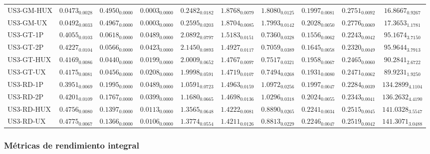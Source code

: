 \begin{longtable}{@{}lccccccccc@{}}
US3-GM-HUX & $0.0473_{0.0028}$ & $0.4950_{0.0000}$ & $0.0003_{0.0000}$ & $0.2482_{0.0182}$ & $1.8768_{0.0079}$ & $1.8080_{0.0125}$ & $0.1997_{0.0081}$ & $0.2751_{0.0092}$ & $16.8667_{0.9267}$ \\
US3-GM-UX & $0.0492_{0.0033}$ & $0.4967_{0.0000}$ & $\mathbf{0.0003}_{0.0000}$ & $0.2595_{0.0203}$ & $1.8704_{0.0085}$ & $1.7993_{0.0142}$ & $0.2028_{0.0050}$ & $0.2776_{0.0069}$ & $17.3653_{1.1781}$ \\
US3-GT-1P & $0.4055_{0.0103}$ & $0.0618_{0.0000}$ & $0.0489_{0.0000}$ & $2.0892_{0.0797}$ & $1.5183_{0.0151}$ & $0.7360_{0.0328}$ & $0.1556_{0.0062}$ & $0.2243_{0.0042}$ & $95.1674_{3.7150}$ \\
US3-GT-2P & $0.4227_{0.0104}$ & $0.0566_{0.0000}$ & $0.0423_{0.0000}$ & $2.1450_{0.0893}$ & $1.4927_{0.0117}$ & $0.7059_{0.0389}$ & $0.1645_{0.0058}$ & $0.2320_{0.0049}$ & $95.9644_{3.7913}$ \\
US3-GT-HUX & $0.4169_{0.0086}$ & $\mathbf{0.0440}_{0.0000}$ & $0.0199_{0.0000}$ & $2.0009_{0.0652}$ & $1.4767_{0.0097}$ & $0.7517_{0.0321}$ & $0.1958_{0.0067}$ & $0.2465_{0.0060}$ & $90.2841_{2.6722}$ \\
US3-GT-UX & $0.4175_{0.0081}$ & $0.0456_{0.0000}$ & $0.0208_{0.0000}$ & $1.9998_{0.0591}$ & $1.4719_{0.0107}$ & $0.7494_{0.0268}$ & $0.1931_{0.0080}$ & $0.2471_{0.0062}$ & $89.9231_{1.9250}$ \\
US3-RD-1P & $0.3951_{0.0069}$ & $0.1995_{0.0000}$ & $0.0489_{0.0000}$ & $1.0591_{0.0723}$ & $1.4963_{0.0159}$ & $1.0972_{0.0256}$ & $0.1997_{0.0047}$ & $0.2284_{0.0039}$ & $134.2899_{4.1104}$ \\
US3-RD-2P & $0.4201_{0.0109}$ & $0.1767_{0.0000}$ & $0.0399_{0.0000}$ & $1.1680_{0.0665}$ & $1.4698_{0.0136}$ & $1.0296_{0.0318}$ & $0.2024_{0.0055}$ & $0.2343_{0.0041}$ & $136.2632_{4.4190}$ \\
US3-RD-HUX & $0.4756_{0.0080}$ & $0.1397_{0.0000}$ & $0.0113_{0.0000}$ & $1.3565_{0.0648}$ & $\mathbf{1.4222}_{0.0081}$ & $0.8890_{0.0265}$ & $0.2241_{0.0034}$ & $0.2515_{0.0045}$ & $141.0328_{3.5547}$ \\
US3-RD-UX & $\mathbf{0.4775}_{0.0067}$ & $0.1366_{0.0000}$ & $0.0106_{0.0000}$ & $1.3774_{0.0554}$ & $\mathbf{1.4211}_{0.0126}$ & $0.8813_{0.0229}$ & $0.2246_{0.0047}$ & $0.2519_{0.0042}$ & $141.3071_{3.0488}$ \\
\end{longtable}
\endgroup

\subsubsection{Métricas de rendimiento integral}

